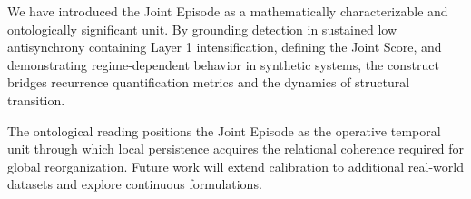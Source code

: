 We have introduced the Joint Episode as a mathematically characterizable and ontologically significant unit. By grounding detection in sustained low antisynchrony containing Layer 1 intensification, defining the Joint Score, and demonstrating regime-dependent behavior in synthetic systems, the construct bridges recurrence quantification metrics and the dynamics of structural transition.

The ontological reading positions the Joint Episode as the operative temporal unit through which local persistence acquires the relational coherence required for global reorganization. Future work will extend calibration to additional real-world datasets and explore continuous formulations.
